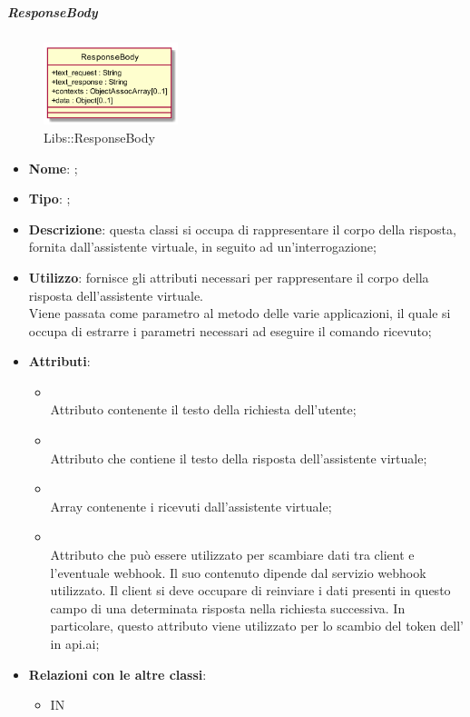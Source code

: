 \hypertarget{ResponseBody_label}{\subparagraph{ResponseBody}}
\begin{figure}[h]
	\centering
	\includegraphics[width=0.35\textwidth,height=\textheight,keepaspectratio]{images/ClassResponseBody.png}
	\caption{Libs::ResponseBody}
\end{figure}
\begin{itemize}
	\item \textbf{Nome}: ;
	\item \textbf{Tipo}: ;
	\item \textbf{Descrizione}: questa classi si occupa di rappresentare il corpo della risposta, fornita dall'assistente virtuale, in seguito ad un'interrogazione;
	\item \textbf{Utilizzo}: fornisce gli attributi necessari per rappresentare il corpo della risposta dell'assistente virtuale. \\
	Viene passata come parametro al metodo  delle varie applicazioni, il quale si occupa di estrarre i parametri necessari ad eseguire il comando ricevuto;
	\item \textbf{Attributi}:
	\begin{itemize}
		\item[]  \\
		Attributo contenente il testo della richiesta dell'utente;
		\item[]  \\
		Attributo che contiene il testo della risposta dell'assistente virtuale;
		\item[]  \\
		Array contenente i  ricevuti dall'assistente virtuale;
		\item[]  \\
		Attributo che può essere utilizzato per scambiare dati tra client e l'eventuale webhook. Il suo contenuto dipende dal servizio webhook utilizzato. Il client si deve occupare di reinviare i dati presenti in questo campo di una determinata risposta nella richiesta successiva. In particolare, questo attributo viene utilizzato per lo scambio del token dell' in api.ai;
	\end{itemize}
	\item \textbf{Relazioni con le altre classi}:
	\begin{itemize}
		\item IN \hyperlink{VAResponse_label}{}
	\end{itemize}
\end{itemize}
\FloatBarrier


